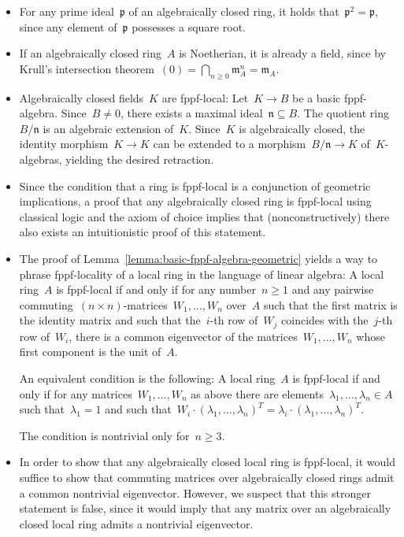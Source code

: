 \documentclass[10pt,reqno,a4paper]{amsbook}
\theoremstyle{definition}
\theoremstyle{plain}
\theoremstyle{remark}
\newcommand{\ppp}{\mathfrak{p}}
\newcommand{\mmm}{\mathfrak{m}}
\newcommand{\nnn}{\mathfrak{n}}
\newcommand{\?}{\,{:}\,}
\renewcommand{\_}{\mathpunct{.}\,}
\begin{document}
\begin{itemize}
\item For any prime ideal~$\ppp$ of an algebraically closed ring, it holds
that~$\ppp^2 = \ppp$, since any element of~$\ppp$ possesses a square root.
\item If an algebraically closed ring~$A$ is Noetherian, it is already a field,
since by Krull's intersection theorem~$(0) = \bigcap_{n \geq 0} \mmm_A^n =
\mmm_A$.
\item Algebraically closed fields~$K$ are fppf-local: Let~$K \to B$ be a basic
fppf-algebra. Since~$B \neq 0$, there exists a maximal ideal~$\nnn \subseteq
B$. The quotient ring~$B/\nnn$ is an algebraic extension of~$K$. Since~$K$ is
algebraically closed, the identity morphism~$K \to K$ can be extended to a
morphism~$B/\nnn \to K$ of~$K$-algebras, yielding the desired retraction.
\item Since the condition that a ring is fppf-local is a conjunction of
geometric implications, a proof that any algebraically closed ring is
fppf-local using classical logic and the axiom of choice implies that
(nonconstructively) there also exists an intuitionistic proof of this statement.
\item The proof of Lemma~\ref{lemma:basic-fppf-algebra-geometric} yields a way
to phrase fppf-locality of a local ring in the language of linear algebra:
A local ring~$A$ is fppf-local if and only if for any number~$n \geq 1$
and any pairwise commuting~$(n \times n)$-matrices~$W_1,\ldots,W_n$ over~$A$ such that
the first matrix is the identity matrix and such that the~$i$-th row of~$W_j$
coincides with the~$j$-th row of~$W_i$, there is a common eigenvector of
the matrices~$W_1,\ldots,W_n$ whose first component is the unit
of~$A$.\label{page:fppf-linear-algebra}

An equivalent condition is the following: A local ring~$A$ is fppf-local if and
only if for any matrices~$W_1,\ldots,W_n$ as above there are
elements~$\lambda_1,\ldots,\lambda_n \in A$ such that~$\lambda_1 = 1$ and such
that~$W_i \cdot (\lambda_1,\ldots,\lambda_n)^T = \lambda_i \cdot
(\lambda_1,\ldots,\lambda_n)^T$.

The condition is nontrivial only for~$n \geq 3$.

\item In order to show that any algebraically closed local ring is fppf-local,
it would suffice to show that commuting matrices over algebraically closed
rings admit a common nontrivial eigenvector. However, we suspect that this
stronger statement is false, since it would imply that any matrix over an
algebraically closed local ring admits a nontrivial eigenvector.


\end{itemize}
\end{document}
